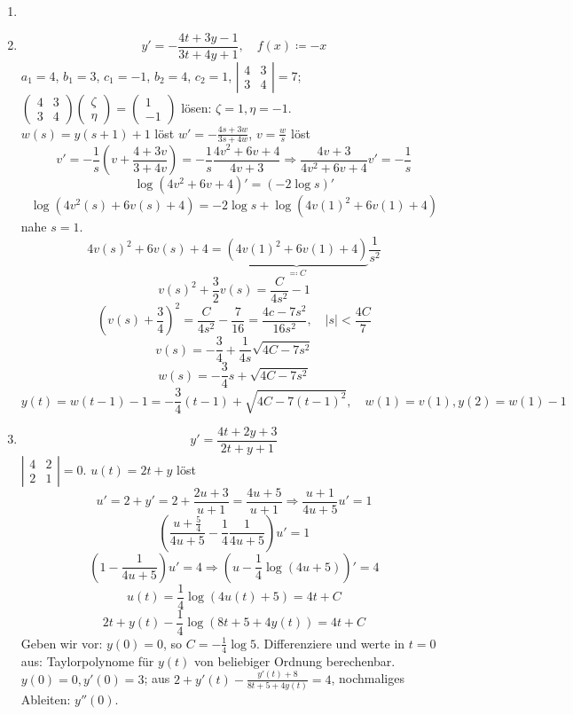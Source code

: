 \begin{beispiel*}
\begin{enumerate}
	\item[]
	\item \[ y'=-\frac{4t+3y-1}{3t+4y+1},\quad f(x)\coloneqq -x \]
	$ a_1=4 $, $ b_1=3 $, $ c_1=-1 $, $ b_2=4 $, $ c_2=1 $, $ \left|\begin{smallmatrix}
	4&3\\3&4
	\end{smallmatrix}\right|=7 $; $ \left(\begin{smallmatrix}
	4&3\\3&4
	\end{smallmatrix}\right)\left(\begin{smallmatrix}
	\zeta\\\eta
	\end{smallmatrix}\right)=\left(\begin{smallmatrix}
	1\\-1
	\end{smallmatrix}\right) $ l\"osen: $ \zeta=1,\eta=-1 $.\\
	$ w(s)=y(s+1)+1 $ l\"ost $ w'=-\frac{4s+3w}{3s+4w} $, $ v=\frac{w}{s} $ l\"ost
	\[ v'=-\frac{1}{s}\left(v+\frac{4+3v}{3+4v}\right)=-\frac{1}{s}\frac{4v^2+6v+4}{4v+3}\Rightarrow\frac{4v+3}{4v^2+6v+4}v'=-\frac{1}{s} \]
	\[ \log(4v^2+6v+4)'=(-2\log s)' \]
	\[ \log(4v^2(s)+6v(s)+4)=-2\log s+\log(4v(1)^2+6v(1)+4) \]
	nahe $ s=1 $.
	\[ 4v(s)^2+6v(s)+4=\underbrace{(4v(1)^2+6v(1)+4)}_{\eqqcolon C}\frac{1}{s^2} \]
	\[ v(s)^2+\frac{3}{2}v(s)=\frac{C}{4s^2}-1 \]
	\[ \left(v(s)+\frac{3}{4}\right)^2=\frac{C}{4s^2}-\frac{7}{16}=\frac{4c-7s^2}{16s^2},\quad |s|<\frac{4C}{7} \]
	\[ v(s)=-\frac{3}{4}+\frac{1}{4s}\sqrt{4C-7s^2} \]
	\[ w(s)=-\frac{3}{4}s+\sqrt{4C-7s^2} \]
	\[ y(t)=w(t-1)-1=-\frac{3}{4}(t-1)+\sqrt{4C-7(t-1)^2},\quad w(1)=v(1), y(2)=w(1)-1 \]
	\item \[ y'=\frac{4t+2y+3}{2t+y+1} \]
	$ \left|\begin{smallmatrix}
	4&2\\2&1
	\end{smallmatrix}\right|=0 $. $ u(t)=2t+y $ l\"ost
	\[ u'=2+y'=2+\frac{2u+3}{u+1}=\frac{4u+5}{u+1}\Rightarrow \frac{u+1}{4u+5}u'=1 \]
	\[ \left(\frac{u+\frac{5}{4}}{4u+5}-\frac{1}{4}\frac{1}{4u+5}\right)u'=1 \]
	\[ \left(1-\frac{1}{4u+5}\right)u'=4\Rightarrow \left(u-\frac{1}{4}\log(4u+5)\right)'=4 \]
	\[ u(t)=\frac{1}{4}\log(4u(t)+5)=4t+C \]
	\[ 2t+y(t)-\frac{1}{4}\log(8t+5+4y(t))=4t+C \]
	Geben wir vor: $ y(0)=0 $, so $ C=-\frac{1}{4}\log 5 $. Differenziere und werte in $ t=0 $ aus: Taylorpolynome f\"ur $ y(t) $ von beliebiger Ordnung berechenbar. $ y(0)=0, y'(0)=3 $; aus $ 2+y'(t)-\frac{y'(t)+8}{8t+5+4y(t)}=4 $, nochmaliges Ableiten: $ y''(0) $.
\end{enumerate}
\end{beispiel*}
